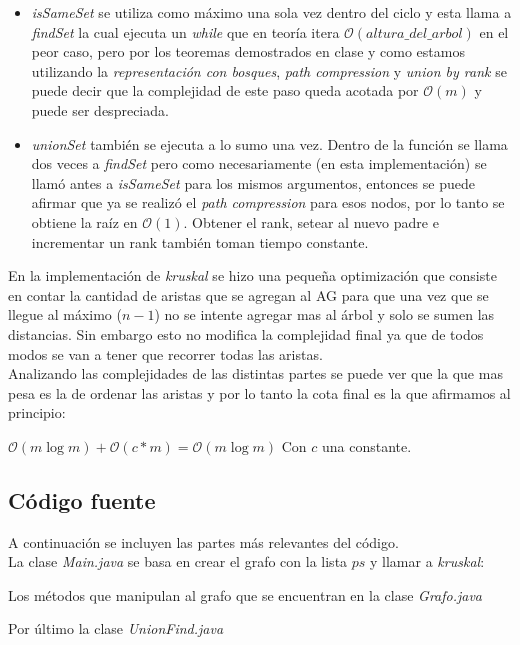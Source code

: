 \begin{itemize}
	\item \textit{isSameSet} se utiliza como máximo una sola vez dentro del ciclo y esta llama a \textit{findSet} la cual ejecuta un \emph{while} que en teoría itera $\mathcal{O}(altura\_del\_arbol)$ en el peor caso, pero por los teoremas demostrados en clase y como estamos utilizando la \emph{representación con bosques}, \emph{path compression} y \emph{union by rank} se puede decir que la complejidad de este paso queda acotada por $\mathcal{O}(m)$ y puede ser despreciada.
	\item \textit{unionSet} también se ejecuta a lo sumo una vez. Dentro de la función se llama dos veces a \textit{findSet} pero como necesariamente (en esta implementación) se llamó antes a \textit{isSameSet} para los mismos argumentos, entonces se puede afirmar que ya se realizó el \emph{path compression} para esos nodos, por lo tanto se obtiene la raíz en $\mathcal{O}(1)$. Obtener el rank, setear al nuevo padre e incrementar un rank también toman tiempo constante.  
\end{itemize}

En la implementación de \textit{kruskal} se hizo una pequeña optimización que consiste en contar la cantidad de aristas que se agregan al AG para que una vez que se llegue al máximo ($n-1$) no se intente agregar mas al árbol y solo se sumen las distancias. Sin embargo esto no modifica la complejidad final ya que de todos modos se van a tener que recorrer todas las aristas.\\

Analizando las complejidades de las distintas partes se puede ver que la que mas pesa es la de ordenar las aristas y por lo tanto la cota final es la que afirmamos al principio:

\begin{center}
	$\mathcal{O}(m\log{}m) + \mathcal{O}(c*m) = \mathcal{O}(m\log{}m)$ Con $c$ una constante.
\end{center}

\subsection{Código fuente}

A continuación se incluyen las partes más relevantes del código.\\
La clase \emph{Main.java} se basa en crear el grafo con la lista $ps$ y llamar a \textit{kruskal}:

Los métodos que manipulan al grafo que se encuentran en la clase \emph{Grafo.java}

Por último la clase \emph{UnionFind.java}



